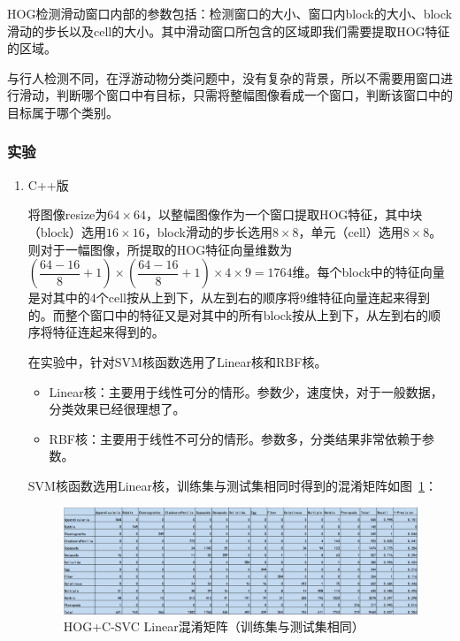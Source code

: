 \documentclass[12pt]{article}
\begin{document}
HOG检测滑动窗口内部的参数包括：检测窗口的大小、窗口内block的大小、block滑动的步长以及cell的大小。其中滑动窗口所包含的区域即我们需要提取HOG特征的区域。

与行人检测不同，在浮游动物分类问题中，没有复杂的背景，所以不需要用窗口进行滑动，判断哪个窗口中有目标，只需将整幅图像看成一个窗口，判断该窗口中的目标属于哪个类别。

\subsubsection{实验}

\begin{enumerate}
\item C++版

将图像resize为$64 \times 64$，以整幅图像作为一个窗口提取HOG特征，其中块（block）选用$16 \times 16$，block滑动的步长选用$8 \times 8$，单元（cell）选用$8 \times 8$。则对于一幅图像，所提取的HOG特征向量维数为$(\dfrac{64-16}{8}+1)\times (\dfrac{64-16}{8}+1) \times 4\times 9=1764$维。每个block中的特征向量是对其中的4个cell按从上到下，从左到右的顺序将9维特征向量连起来得到的。而整个窗口中的特征又是对其中的所有block按从上到下，从左到右的顺序将特征连起来得到的。

在实验中，针对SVM核函数选用了Linear核和RBF核。

\begin{itemize} 
\item Linear核：主要用于线性可分的情形。参数少，速度快，对于一般数据，分类效果已经很理想了。
\item RBF核：主要用于线性不可分的情形。参数多，分类结果非常依赖于参数。
\end{itemize}

SVM核函数选用Linear核，训练集与测试集相同时得到的混淆矩阵如图~\ref{fig: Train-CM-HOG-SVM-Linear}：
\begin{figure}[!ht]
\centering
\includegraphics[width=1.0\linewidth]{Train-CM-HOG-SVM-Linear}
\caption{HOG+C-SVC Linear混淆矩阵（训练集与测试集相同）}
\label{fig: Train-CM-HOG-SVM-Linear}
\end{figure}


\end{enumerate}
\end{document}
